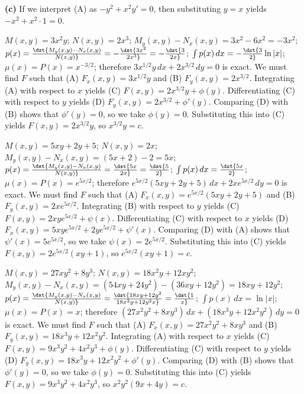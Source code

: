 \documentclass[dvips]{book}
\renewcommand{\exer}[1]{\par\medskip\;\noindent{\color{red}\bf #1.}}
\numberwithin{example}{section}
\numberwithin{equation}{section}
\numberwithin{theorem}{section}
\numberwithin{table}{section}
\numberwithin{figure}{section}
\begin{document}
{\bf (c)} If we interpret (A) as $-y^2+x^2y'=0$, then substituting
$y=x$ yields $-x^2+x^2\cdot1=0$.



\exer{2.6.4}
$M(x,y)=3x^2y$;\;
$N(x,y)=2x^3$;\;
$M_y(x,y)-N_x(x,y)=3x^2-6x^2=-3x^2$;\;
$p(x)=\dst{M_y(x,y)-N_x(x,y)\over
N(x,y)}=-\dst{3x^2\over2x^3}=-\dst{3\over2x}$;\;
$\int p(x)\,dx=-\dst{3\over2}\ln|x|$;\;
$\mu(x)=P(x)=x^{-3/2}$;
therefore
$3x^{1/2}y\,dx+2x^{3/2}\,dy=0$
is exact.
We must find $F$ such that
(A) $F_x(x,y)=3x^{1/2}y$ and
(B) $F_y(x,y)=2x^{3/2}$.
Integrating (A) with respect to $x$ yields
(C) $F(x,y)=2x^{3/2}y+\phi(y)$.
Differentiating (C) with respect to $y$  yields
(D) $F_y(x,y)=2x^{3/2}+\phi'(y)$.
Comparing (D) with (B)  shows that
$\phi'(y)=0$, so we take
$\phi(y)=0$.
Substituting this into (C) yields
$F(x,y)=2x^{3/2}y$,
so $x^{3/2}y=c$.


\exer{2.6.6}
$M(x,y)=5xy+2y+5$;\;
$N(x,y)=2x$;\;
$M_y(x,y)-N_x(x,y)=(5x+2)-2=5x$;\;
$p(x)=\dst{M_y(x,y)-N_x(x,y)\over
N(x,y)}=\dst{5x\over2x}=\dst{5\over2}$;\;
$\int p(x)\,dx=\dst{5x\over2}$;\;
$\mu(x)=P(x)=e^{5x/2}$;
therefore
$e^{5x/2}(5xy+2y+5)\,dx+2xe^{5x/2}\,dy=0$
is exact.
We must find $F$ such that
(A) $F_x(x,y)=e^{5x/2}(5xy+2y+5)$ and
(B) $F_y(x,y)=2xe^{5x/2}$.
Integrating (B) with respect to $y$ yields
(C) $F(x,y)=2xye^{5x/2}+\psi(x)$.
Differentiating (C) with respect to $x$  yields
(D) $F_x(x,y)=5xye^{5x/2}+2ye^{5x/2}+\psi'(x)$.
Comparing (D) with (A)  shows that
$\psi'(x)=5e^{5x/2}$, so we take
$\psi(x)=2e^{5x/2}$.
Substituting this into (C) yields
$F(x,y)=2e^{5x/2}(xy+1)$,
so $e^{5x/2}(xy+1)=c$.


\exer{2.6.8}
$M(x,y)=27xy^2+8y^3$;\;
$N(x,y)=18x^2y+12xy^2$;\;
$M_y(x,y)-N_x(x,y)=(54xy+24y^2)-(36xy+12y^2)=18xy+12y^2$;\;
$p(x)=\dst{M_y(x,y)-N_x(x,y)\over N(x,y)}=\dst{18xy+12y^2\over
18x^2y+12y^2x}=\dst{1\over x}$;\;
$\int p(x)\,dx=\ln|x|$;\;
$\mu(x)=P(x)=x$;
therefore
$(27x^2y^2+8xy^3)\,dx+(18x^3y+12x^2y^2)\,dy=0$
is exact.
We must find $F$ such that
(A) $F_x(x,y)=27x^2y^2+8xy^3$ and
(B) $F_y(x,y)=18x^3y+12x^2y^2$.
Integrating (A) with respect to $x$ yields
(C) $F(x,y)=9x^3y^2+4x^2y^3+\phi(y)$.
Differentiating (C) with respect to $y$  yields
(D) $F_y(x,y)=18x^3y+12x^2y^2+\phi'(y)$.
Comparing (D) with (B)  shows that
$\phi'(y)=0$, so we take
$\phi(y)=0$.
Substituting this into (C) yields
$F(x,y)=9x^3y^2+4x^2y^3$,
so $x^2y^2(9x+4y)=c$.
\end{document}
